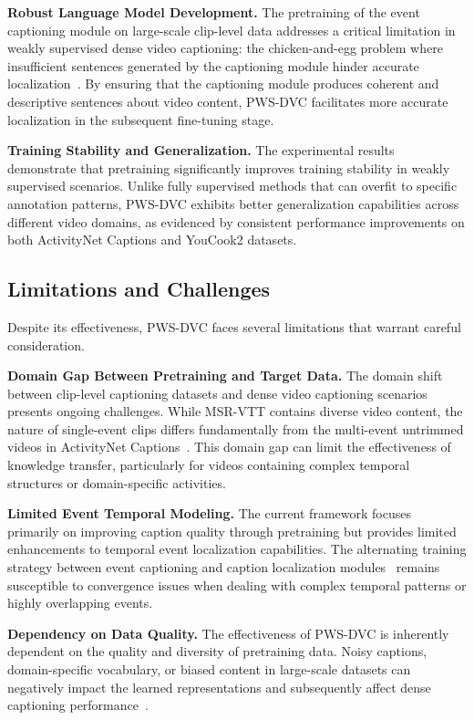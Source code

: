 \textbf{Robust Language Model Development.}
The pretraining of the event captioning module on large-scale clip-level data addresses a critical limitation in weakly supervised dense video captioning: the chicken-and-egg problem where insufficient sentences generated by the captioning module hinder accurate localization~\cite{Duan2018-qf,Shen2017-gx}. By ensuring that the captioning module produces coherent and descriptive sentences about video content, PWS-DVC facilitates more accurate localization in the subsequent fine-tuning stage.

\textbf{Training Stability and Generalization.}
The experimental results demonstrate that pretraining significantly improves training stability in weakly supervised scenarios. Unlike fully supervised methods that can overfit to specific annotation patterns, PWS-DVC exhibits better generalization capabilities across different video domains, as evidenced by consistent performance improvements on both ActivityNet Captions and YouCook2 datasets.

\subsection{Limitations and Challenges}

Despite its effectiveness, PWS-DVC faces several limitations that warrant careful consideration.

\textbf{Domain Gap Between Pretraining and Target Data.}
The domain shift between clip-level captioning datasets and dense video captioning scenarios presents ongoing challenges. While MSR-VTT contains diverse video content, the nature of single-event clips differs fundamentally from the multi-event untrimmed videos in ActivityNet Captions~\cite{Krishna2017-pw}. This domain gap can limit the effectiveness of knowledge transfer, particularly for videos containing complex temporal structures or domain-specific activities.

\textbf{Limited Event Temporal Modeling.}
The current framework focuses primarily on improving caption quality through pretraining but provides limited enhancements to temporal event localization capabilities. The alternating training strategy between event captioning and caption localization modules~\cite{Chen2021-sv} remains susceptible to convergence issues when dealing with complex temporal patterns or highly overlapping events.

\textbf{Dependency on Data Quality.}
The effectiveness of PWS-DVC is inherently dependent on the quality and diversity of pretraining data. Noisy captions, domain-specific vocabulary, or biased content in large-scale datasets can negatively impact the learned representations and subsequently affect dense captioning performance~\cite{Miech2019-hk}.

